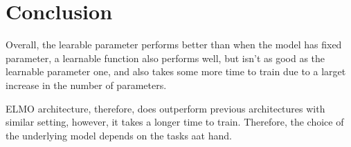 \section*{Conclusion}
\label{sec:conclusion}

Overall, the learable parameter performs better than when the model has fixed parameter, a learnable function also performs well, but isn't as good as the learnable parameter one, and also takes some more time to train due to a larget increase in the number of parameters. 

ELMO architecture, therefore, does outperform previous architectures with similar setting, however, it takes a longer time to train. Therefore, the choice of the underlying model depends on the tasks aat hand.
